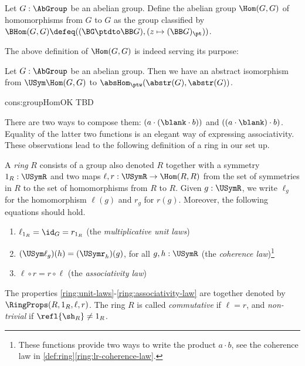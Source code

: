 \begin{definition}\label{def:groupHom}
Let $G:\AbGroup$ be an abelian group. Define the abelian group $\Hom(G,G)$
of homomorphisms from $G$ to $G$ as the group classified
by $\BHom(G,G) \defeq ((\BG\ptdto\BB G),(z\mapsto (\BB G)_\pt))$.
\end{definition}

The above definition of $\Hom(G,G)$ is indeed serving its purpose:

\begin{construction}\label{cons:groupHomOK}
Let $G:\AbGroup$ be an abelian group. Then we have an abstract isomorphism
from $\USym\Hom(G,G)$ to $\absHom_{\ptw}(\abstr(G),\abstr(G))$.
\end{construction}
\begin{implementation}{cons:groupHomOK}
TBD
\end{implementation}


There are two ways to compose them: $(a\cdot(\blank\cdot b))$
and $((a\cdot\blank)\cdot b)$. Equality of the latter two functions is
an elegant way of expressing associativity.
These observations lead to the following definition of a 
ring in our set up.

\begin{definition}\label{def:ring}
A \emph{ring} $R$ consists of a group also denoted $R$ together with
a symmetry $1_R : \USymR$ and two maps $\ell,r: \USymR\to\Hom(R,R)$
from the set of symmetries in $R$ to the set of homomorphisms from
$R$ to $R$.
Given $g:\USymR$, we write $\ell_g$ for the homomorphism $\ell(g)$ and 
$r_g$ for $r(g)$.
Moreover, the following equations should hold.
    \begin{enumerate}
    \item\label{ring:unit-laws} $\ell_{1_R} = \id_G = r_{1_R}$ (the \emph{multiplicative unit laws})
    \item\label{ring:lr-coherence-law} $(\USym\ell_g)(h) = (\USymr_h)(g)$, 
    for all $g,h : \USymR$ (the \emph{coherence law})\footnote{%
    These functions provide two ways to write the product $a\cdot b$,
see the coherence law in \cref{def:ring}\ref{ring:lr-coherence-law}.}
        \item\label{ring:associativity-law} $\ell\circ r= r\circ\ell$ (the \emph{associativity law})
    \end{enumerate}
The properties \ref{ring:unit-laws}-\ref{ring:associativity-law} 
are together denoted by $\RingProps(R,1_R,\ell,r)$.
The ring $R$ is called \emph{commutative} if $\ell=r$, 
and \emph{non-trivial} if $\refl{\sh_R}\neq 1_R$.
\end{definition}

